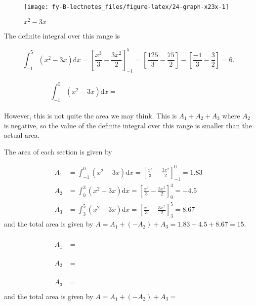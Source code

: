 \documentclass[
  english,
  11pt,
  oneside]{book}
\newcommand{\slide}{}
\theoremstyle{definition}
\theoremstyle{definition}
\theoremstyle{definition}
\theoremstyle{definition}
\theoremstyle{remark}
\begin{document}
\begin{figure}

{\centering \texttt{[image: fy-B-lectnotes\_files/figure-latex/24-graph-x23x-1]} 

}

\caption{$x^2-3x$}\label{fig:24-graph-x23x}
\end{figure}
\slide

The definite integral over this range is

\begin{notslides}

\[
\int_{-1}^5(x^2-3x)\mathrm{d}x = \left[\frac{x^3}3-\frac{3x^2}2\right]_{-1}^5 = \left[\frac{125}3-\frac{75}2\right]-\left[\frac{-1}3-\frac{3}2\right]=6.
\]

\end{notslides}

\begin{slidesonly}

\[
\int_{-1}^5(x^2-3x)\mathrm{d}x = \phantom{\left[\frac{x^3}3-\frac{3x^2}2\right]_{-1}^5 = \left[\frac{125}3-\frac{75}2\right]}
\]
\vfill

\end{slidesonly}

However, this is not quite the area we may think. This is \(A_1 + A_2 + A_3\) where \(A_2\) is negative, so the value of the definite integral over this range is smaller than the actual area.

\slide

The area of each section is given by

\begin{notslides}

\begin{align*}
A_1&=\int_{-1}^0(x^2-3x)\mathrm{d}x = \left[\frac{x^3}3-\frac{3x^2}2\right]_{-1}^0 = 1.83\\
A_2&=\int_{0}^3(x^2-3x)\mathrm{d}x = \left[\frac{x^3}3-\frac{3x^2}2\right]_{0}^3 = -4.5\\
A_3&=\int_{3}^5(x^2-3x)\mathrm{d}x = \left[\frac{x^3}3-\frac{3x^2}2\right]_{3}^5 = 8.67
\end{align*}
and the total area is given by \(A = A_1 + (-A_2) + A_3 = 1.83 + 4.5 + 8.67 = 15\).

\end{notslides}

\begin{slidesonly}

\begin{align*}
A_1&=\phantom{\int_{-1}^0(x^2-3x)\mathrm{d}x = \left[\frac{x^3}3-\frac{3x^2}2\right]_{-1}^0 = 1.83}\\
A_2&=\phantom{\int_{0}^3(x^2-3x)\mathrm{d}x = \left[\frac{x^3}3-\frac{3x^2}2\right]_{0}^3 = -4.5}\\
A_3&=\phantom{\int_{3}^5(x^2-3x)\mathrm{d}x = \left[\frac{x^3}3-\frac{3x^2}2\right]_{3}^5 = 8.67}
\end{align*}
and the total area is given by \(A = A_1 + (-A_2) + A_3 =\)

\end{slidesonly}
\end{document}
